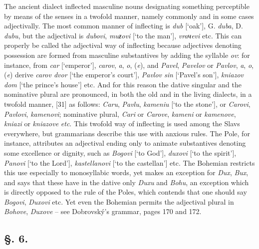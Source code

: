 The ancient dialect inflected masculine nouns designating something perceptible by means of the senses in a twofold manner, namely commonly and in some cases adjectivally. The most common manner of inflecting is \textit{dub} [‘oak’], G. \textit{duba}, D. \textit{dubu}, but the adjectival is \textit{dubovi}, \textit{muƶovi} [‘to the man’], \textit{vraчevi} etc. This can properly be called the adjectival way of inflecting because adjectives denoting possession are formed from masculine substantives by adding the syllable \textit{ov}: for instance, from \textit{car} [‘emperor’], \textit{carov}, \textit{a}, \textit{o}, (\textit{e}), and \textit{Pavel}, \textit{Pavelov} or \textit{Pavlov}, \textit{a}, \textit{o}, (\textit{e}) derive \textit{carov dvor} [‘the emperor’s court’], \textit{Pavlov sin} [‘Pavel’s son’], \textit{kniazov dom} [‘the prince’s house’] etc. And for this reason the dative singular and the nominative plural are pronounced, in both the old and in the living dialects, in a twofold manner, [31] as follows: \textit{Caru}, \textit{Pavlu}, \textit{kameniu} [‘to the stone’], or \textit{Carovi}, \textit{Pavlovi}, \textit{kamenovi}; nominative plural, \textit{Cari} or \textit{Carove}, \textit{kameni} or \textit{kamenove}, \textit{kniazi} or \textit{kniazove} \textit{etc}. This twofold way of inflecting is used among the Slavs everywhere, but grammarians describe this use with anxious rules. The Pole, for instance, attributes an adjectival ending only to animate substantives denoting some excellence or dignity, such as \textit{Bogovi} [‘to God’], \textit{duxovi} [‘to the spirit’], \textit{Panovi} [‘to the Lord’], \textit{kastellanovi} [‘to the castellan’] etc. The Bohemian restricts this use especially to monosyllabic words, yet makes an exception for \textit{Dux}, \textit{Bux}, and says that these have in the dative only \textit{Duxu} and \textit{Bohu}, an exception which is directly opposed to the rule of the Poles, which contends that one should say \textit{Bogovi}, \textit{Duxovi} etc. Yet even the Bohemian permits the adjectival plural in \textit{Bohove}, \textit{Duxove} -- see Dobrovský’s grammar, pages 170 and 172.

\subsection*{\hspace*{\fill}§. 6.\hspace*{\fill}}

